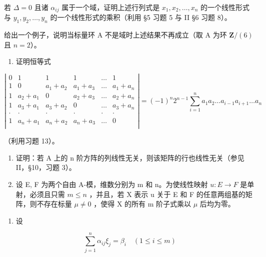 若 \(\Delta = 0\) 且诸 \(\alpha_{ij}\) 属于一个域，证明上述行列式是 \(x_1, x_2, \ldots, x_n\) 的一个线性形式与 \(y_1, y_2, \ldots, y_n\) 的一个线性形式的乘积（利用 §5 习题 5 与 II §6 习题 8）。

给出一个例子，说明当标量环 A 不是域时上述结果不再成立（取 A 为环 \(\mathbf{Z} / (6)\) 且 \(n = 2\)）。

\begin{enumerate}
\def\labelenumi{\arabic{enumi}.}
\setcounter{enumi}{13}
\tightlist
\item
  证明恒等式
\end{enumerate}

\[
\left| \begin{array}{cccccc} 0 & 1 & 1 & 1 & \ldots & 1 \\ 1 & 0 & a _ {1} + a _ {2} & a _ {1} + a _ {3} & \ldots & a _ {1} + a _ {n} \\ 1 & a _ {2} + a _ {1} & 0 & a _ {2} + a _ {3} & \ldots & a _ {2} + a _ {n} \\ 1 & a _ {3} + a _ {1} & a _ {3} + a _ {2} & 0 & \ldots & a _ {3} + a _ {n} \\ \cdot & \cdot & \cdot & \cdot & \cdot & \cdot \\ 1 & a _ {n} + a _ {1} & a _ {n} + a _ {2} & a _ {n} + a _ {3} & \ldots & 0 \\ \end{array} \right| = (- 1) ^ {n} 2 ^ {n - 1} \sum_ {i = 1} ^ {n} a _ {1} a _ {2} \ldots a _ {i - 1} a _ {i + 1} \ldots a _ {n}
\]

（利用习题 13）。

\begin{enumerate}
\def\labelenumi{\arabic{enumi}.}
\setcounter{enumi}{14}
\item
  证明：若 A 上的 n 阶方阵的列线性无关，则该矩阵的行也线性无关（参见 II，§10，习题 3）。
\item
  设 E, F 为两个自由 A-模，维数分别为 m 和 n。为使线性映射 \(u: E \rightarrow F\) 是单射，必须且只需 \(m \leqslant n\) ，并且，若 X 表示 u 关于 E 和 F 的任意两组基的矩阵，则不存在标量 \(\mu \neq 0\) ，使得 X 的所有 m 阶子式乘以 \(\mu\) 后均为零。
\end{enumerate}

\begin{enumerate}
\def\labelenumi{\arabic{enumi}.}
\setcounter{enumi}{16}
\tightlist
\item
  设
\end{enumerate}

\[
\sum_ {j = 1} ^ {n} \alpha_ {i j} \xi_ {j} = \beta_ {i} \quad (1 \leqslant i \leqslant m)\tag{*}
\]

